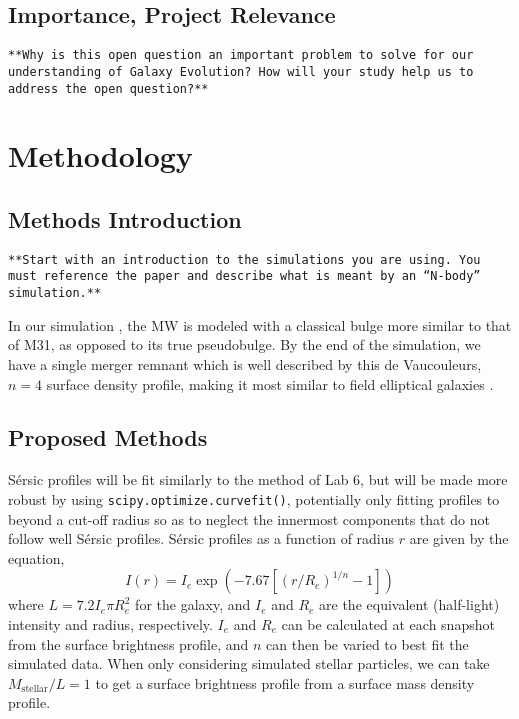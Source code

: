 \documentclass[twocolumn]{aastex631}
\begin{document}
\subsection{Importance, Project Relevance}
\texttt{**Why is this open question an important problem to solve for our understanding of Galaxy Evolution? How will your study help us to address the open question?**}


\section{Methodology}
\subsection{Methods Introduction}
\texttt{**Start with an introduction to the simulations you are using. You must
reference the paper and describe what is meant by an “N-body” simulation.**}

In our simulation \citep{paper3}, the MW is modeled with a classical bulge more similar to that of M31, as opposed to its true pseudobulge. By the end of the simulation, we have a single merger remnant which is well described by this de Vaucouleurs, $n=4$ surface density profile, making it most similar to field elliptical galaxies \citep{paper3}.

\subsection{Proposed Methods}
S\'{e}rsic profiles will be fit similarly to the method of Lab 6, but will be made more robust by using \texttt{scipy.optimize.curvefit()}, potentially only fitting profiles to beyond a cut-off radius so as to neglect the innermost components that do not follow well S\'{e}rsic profiles. S\'ersic profiles as a function of radius $r$ are given by the equation,
\begin{equation}
    \label{eqn:sersic}
    I(r) = I_e \exp{(-7.67[(r/R_e)^{1/n} - 1])}
\end{equation}
where $L = 7.2 I_e \pi R_e^2$ for the galaxy, and $I_e$ and $R_e$ are the equivalent (half-light) intensity and radius, respectively. $I_e$ and $R_e$ can be calculated at each snapshot from the surface brightness profile, and $n$ can then be varied to best fit the simulated data. When only considering simulated stellar particles, we can take $M_\mathrm{stellar}/L = 1$ to get a surface brightness profile from a surface mass density profile.
\end{document}
